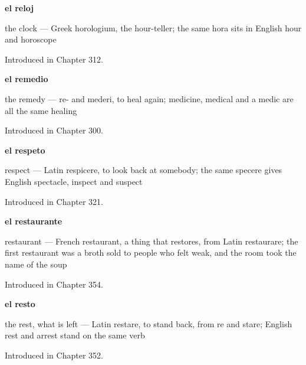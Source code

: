 \noindent\begin{minipage}[t]{\linewidth}
\raggedright
\textbf{el reloj}\par
\small the clock — Greek horologium, the hour-teller; the same hora sits in English hour and horoscope\par
\footnotesize Introduced in Chapter 312.
\end{minipage}\par\medskip

\noindent\begin{minipage}[t]{\linewidth}
\raggedright
\textbf{el remedio}\par
\small the remedy — re- and mederi, to heal again; medicine, medical and a medic are all the same healing\par
\footnotesize Introduced in Chapter 300.
\end{minipage}\par\medskip

\noindent\begin{minipage}[t]{\linewidth}
\raggedright
\textbf{el respeto}\par
\small respect — Latin respicere, to look back at somebody; the same specere gives English spectacle, inspect and suspect\par
\footnotesize Introduced in Chapter 321.
\end{minipage}\par\medskip

\noindent\begin{minipage}[t]{\linewidth}
\raggedright
\textbf{el restaurante}\par
\small restaurant — French restaurant, a thing that restores, from Latin restaurare; the first restaurant was a broth sold to people who felt weak, and the room took the name of the soup\par
\footnotesize Introduced in Chapter 354.
\end{minipage}\par\medskip

\noindent\begin{minipage}[t]{\linewidth}
\raggedright
\textbf{el resto}\par
\small the rest, what is left — Latin restare, to stand back, from re and stare; English rest and arrest stand on the same verb\par
\footnotesize Introduced in Chapter 352.
\end{minipage}\par\medskip

